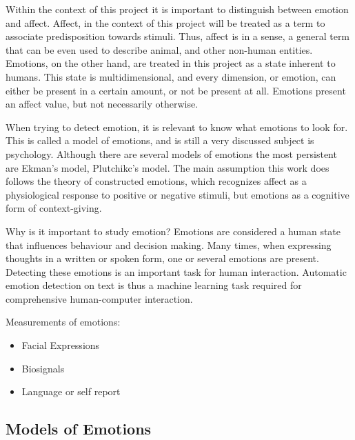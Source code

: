 

Within the context of this project it is important to distinguish between emotion and affect. Affect, in the context of this project will be treated as a term to associate predisposition towards stimuli. Thus, affect is in a sense, a general term that can be even used to describe animal, and other non-human entities. Emotions, on the other hand, are treated in this project as a state inherent to humans. This state is multidimensional, and every dimension, or emotion, can either be present in a certain amount, or not be present at all.
Emotions present an affect value, but not necessarily otherwise.



When trying to detect emotion, it is relevant to know what emotions to look for. This is called a model of emotions, and is still a very discussed subject is psychology. Although there are several models of emotions the most persistent are Ekman’s model, Plutchikc’s model. The main assumption this work does follows the theory of constructed emotions, which recognizes affect as a physiological response to positive or negative stimuli, but emotions as a cognitive form of context-giving.

Why is it important to study emotion?
Emotions are considered a human state that influences behaviour and decision making. Many times, when expressing thoughts in a written or spoken form, one or several emotions are present. Detecting these emotions is an important task for human interaction. Automatic emotion detection on text is thus a machine learning task required for comprehensive human-computer interaction.




Measurements of emotions:
\begin{itemize}
  \item Facial Expressions
  \item Biosignals
  \item Language or self report
\end{itemize}

\subsection{Models of Emotions}\label{sub:Models of Emotions}

